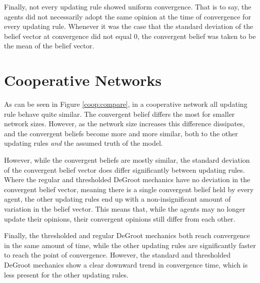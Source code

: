 \documentclass[a4paper, 12pt]{report}
\begin{document}
\noindent Finally, not every updating rule showed uniform convergence. That is to say, the agents did not necessarily adopt the same opinion at the time of convergence for every updating rule. Whenever it was the case that the standard deviation of the belief vector at convergence did not equal $0$, the convergent belief was taken to be the mean of the belief vector.

\section{Cooperative Networks}

As can be seen in Figure \ref{coop:compare}, in a cooperative network all updating rule behave quite similar. The convergent belief differs the most for smaller network sizes. However, as the network size increases this difference dissipates, and the convergent beliefs become more and more similar, both to the other updating rules \emph{and} the assumed truth of the model.

\noindent However, while the convergent beliefs are mostly similar, the standard deviation of the convergent belief vector does differ significantly between updating rules. Where the regular and thresholded DeGroot mechanics have no deviation in the convergent belief vector, meaning there is a single convergent belief held by every agent, the other updating rules end up with a non-insignificant amount of variation in the belief vector. This means that, while the agents may no longer update their opinions, their convergent opinions still differ from each other. 

\noindent Finally, the thresholded and regular DeGroot mechanics both reach convergence in the same amount of time, while the other updating rules are significantly faster to reach the point of convergence. However, the standard and thresholded DeGroot mechanics show a clear downward trend in convergence time, which is less present for the other updating rules.
\end{document}
